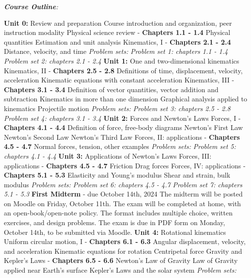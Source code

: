 \documentclass[10pt]{article}
\begin{document}
\clearpage
\twocolumn
\noindent
\textit{\textbf{Course Outline}:}
\begin{outline}[enumerate]
\1 \textbf{Unit 0:} Review and preparation 
\2 Course introduction and organization, peer instruction modality
\2 Physical science review - \textbf{Chapters 1.1 - 1.4}
\3 Physical quantities
\3 Estimation and unit analysis
\2 Kinematics, I - \textbf{Chapters 2.1 - 2.4}
\3 Distance, velocity, and time
\2 \textit{Problem sets:}
\3 \textit{Problem set 1: chapters 1.1 - 1.4}
\3 \textit{Problem set 2: chapters 2.1 - 2.4}
\1 \textbf{Unit 1:} One and two-dimensional kinematics
\2 Kinematics, II - \textbf{Chapters 2.5 - 2.8}
\3 Definitions of time, displacement, velocity, acceleration
\3 Kinematic equations with constant acceleration
\2 Kinematics, III - \textbf{Chapters 3.1 - 3.4}
\3 Definition of vector quantities, vector addition and subtraction
\3 Kinematics in more than one dimension
\3 Graphical analysis applied to kinematics
\3 Projectile motion
\2 \textit{Problem sets:}
\3 \textit{Problem set 3: chapters 2.5 - 2.8}
\3 \textit{Problem set 4: chapters 3.1 - 3.4}
\1 \textbf{Unit 2:} Forces and Newton's Laws
\2 Forces, I - \textbf{Chapters 4.1 - 4.4}
\3 Definition of force, free-body diagrams
\3 Newton's First Law
\3 Newton's Second Law
\3 Newton's Third Law
\2 Forces, II: applications - \textbf{Chapters 4.5 - 4.7}
\3 Normal forces, tension, other examples
\2 \textit{Problem sets:}
\3 \textit{Problem set 5: chapters 4.1 - 4.4}
\1 \textbf{Unit 3:} Applications of Newton's Laws
\2 Forces, III: applications - \textbf{Chapters 4.5 - 4.7}
\3 Friction
\3 Drag forces
\2 Forces, IV: applications - \textbf{Chapters 5.1 - 5.3}
\3 Elasticity and Young's modulus
\3 Shear and strain, bulk modulus
\2 \textit{Problem sets:}
\3 \textit{Problem set 6: chapters 4.5 - 4.7}
\3 \textit{Problem set 7: chapters 5.1 - 5.3}
\1 \textbf{First Midterm} - due October 14th, 2024
\2 The midterm will be posted on Moodle on Friday, October 11th.
\2 The exam will be completed at home, with an open-book/open-note policy.  The format includes multiple choice, written exercises, and design problems.
\2 The exam is due in PDF form on Monday, October 14th, to be submitted via Moodle.
\1 \textbf{Unit 4:} Rotational kinematics
\2 Uniform circular motion, I - \textbf{Chapters 6.1 - 6.3}
\3 Angular displacement, velocity, and acceleration
\3 Kinematic equations for rotation
\3 Centripetal force
\2 Gravity and Kepler's Laws - \textbf{Chapters 6.5 - 6.6}
\3 Newton's Law of Gravity
\3 Law of Gravity applied near Earth's surface
\3 Kepler's Laws and the solar system
\2 \textit{Problem sets:}

\end{outline}
\end{document}
